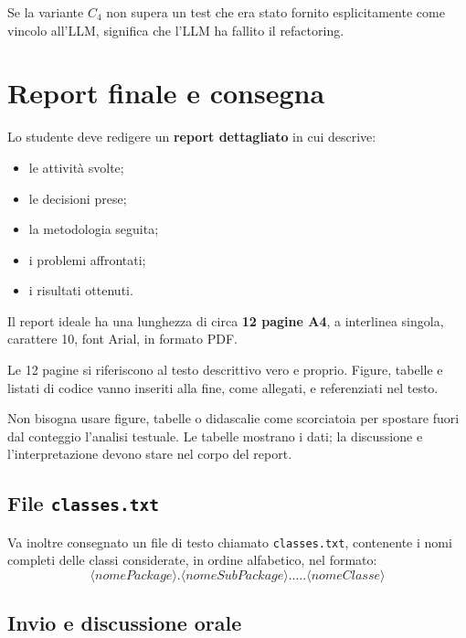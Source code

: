\begin{notaprof}
Se la variante \(C_4\) non supera un test che era stato fornito esplicitamente come vincolo all'LLM, significa che l'LLM ha fallito il refactoring.
\end{notaprof}

\section{Report finale e consegna}

Lo studente deve redigere un \textbf{report dettagliato} in cui descrive:
\begin{itemize}
    \item le attività svolte;
    \item le decisioni prese;
    \item la metodologia seguita;
    \item i problemi affrontati;
    \item i risultati ottenuti.
\end{itemize}

Il report ideale ha una lunghezza di circa \textbf{12 pagine A4}, a interlinea singola, carattere 10, font Arial, in formato PDF.

\begin{notaprof}
Le 12 pagine si riferiscono al testo descrittivo vero e proprio. Figure, tabelle e listati di codice vanno inseriti alla fine, come allegati, e referenziati nel testo.
\end{notaprof}

\begin{notaesame}
Non bisogna usare figure, tabelle o didascalie come scorciatoia per spostare fuori dal conteggio l'analisi testuale. Le tabelle mostrano i dati; la discussione e l'interpretazione devono stare nel corpo del report.
\end{notaesame}

\subsection{File \texttt{classes.txt}}

Va inoltre consegnato un file di testo chiamato \texttt{classes.txt}, contenente i nomi completi delle classi considerate, in ordine alfabetico, nel formato:
\[
\langle nomePackage \rangle . \langle nomeSubPackage \rangle . \dots . \langle nomeClasse \rangle
\]

\subsection{Invio e discussione orale}

